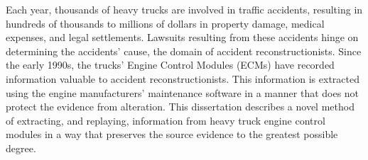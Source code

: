 Each year, thousands of heavy trucks are involved in traffic accidents, resulting in hundreds of thousands
to millions of dollars in property damage, medical expenses, and legal settlements. Lawsuits resulting from
these accidents hinge on determining the accidents' cause, the domain of accident reconstructionists. Since
the early 1990s, the trucks' Engine Control Modules (ECMs) have recorded information valuable to accident
reconstructionists. This information is extracted using the engine manufacturers' maintenance software in
a manner that does not protect the evidence from alteration. This dissertation describes a novel method
of extracting, and replaying, information from heavy truck engine control modules in a way that preserves
the source evidence to the greatest possible degree.
